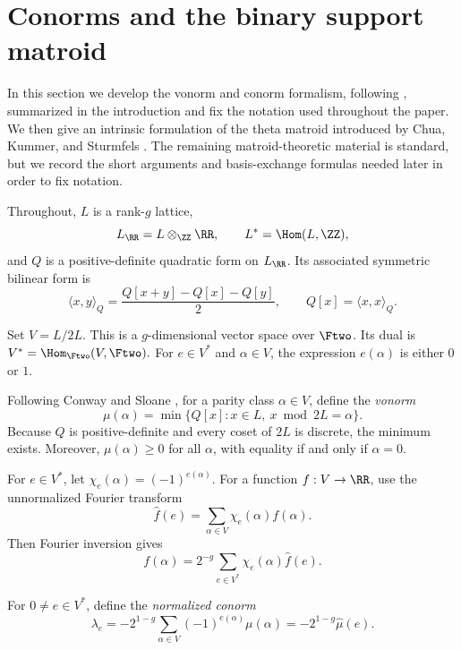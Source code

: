 \documentclass[11pt,letterpaper]{amsart}
\begin{document}

\section{Conorms and the binary support matroid}\label{sec:conorms}

In this section we develop the vonorm and conorm formalism, following \cite{CS}, summarized in the introduction and fix the notation used throughout the paper. We then give an intrinsic formulation of the theta matroid introduced by
Chua, Kummer, and Sturmfels \cite{chua2019schottky}. The remaining matroid-theoretic material is standard, but we record the short arguments and basis-exchange formulas needed later in order to fix notation.

Throughout, $L$ is a rank-$g$ lattice,
\[
    L_{\RR}=L\otimes_{\ZZ}\RR,
    \qquad
    L^*=\Hom(L,\ZZ),
\]
and $Q$ is a positive-definite quadratic form on $L_{\RR}$. Its associated symmetric bilinear form is
\[
    \langle x,y\rangle_Q
    =
    \frac{Q[x+y]-Q[x]-Q[y]}{2},
    \qquad
    Q[x]=\langle x,x\rangle_Q.
\]

Set $V=L/2L.$ This is a $g$-dimensional vector space over $\Ftwo$.  Its dual is $V^*=\Hom_{\Ftwo}(V,\Ftwo).$ For $e\in V^*$ and $\alpha\in V$, the expression $e(\alpha)$ is either $0$ or $1$.

\begin{definition}
Following Conway and Sloane \cite{CS}, for a parity class $\alpha\in V$, define the \emph{vonorm}
\[
  \mu(\alpha)=\min\{Q[x]:x\in L,\ x\bmod 2L=\alpha\}.
\]
Because $Q$ is positive-definite and every coset of $2L$ is discrete, the minimum exists.  Moreover, $\mu(\alpha) \geq 0$ for all $\alpha$, with equality if and only if $\alpha = 0$.
\end{definition}

For $e\in V^*$, let $\chi_e(\alpha)=(-1)^{e(\alpha)}.$ For a function  $f:V\to\RR$, use the unnormalized Fourier transform
\[
  \widehat f(e)=\sum_{\alpha\in V}\chi_e(\alpha)f(\alpha).
\]
Then Fourier inversion gives
\[
  f(\alpha)=2^{-g}\sum_{e\in V^*}\chi_e(\alpha)\widehat f(e).
\]

\begin{definition}
For $0\ne e\in V^*$, define the \emph{normalized conorm}
\begin{equation}\label{eq:lambda-def}
  \lambda_e=-2^{1-g}
  \sum_{\alpha\in V}(-1)^{e(\alpha)}\mu(\alpha)
  =-2^{1-g}\widehat\mu(e).
\end{equation}
\end{definition}
\end{document}
